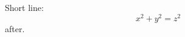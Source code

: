 \documentclass[10pt]{article}
\begin{document}
Short line:
\begin{equation} x^2 + y^2 = z^2 \end{equation}
after.
\end{document}
